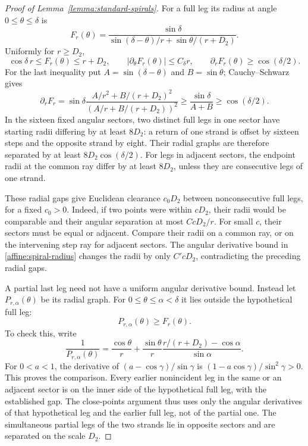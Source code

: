 \begin{proof}[Proof of Lemma~\ref{lemma:standard-spirals}]
For a full leg its radius at angle $0\le\theta\le\delta$ is
\begin{equation}\label{affine:spiral-radius}
 F_r(\theta)=
 \frac{\sin\delta}
 {\sin(\delta-\theta)/r+\sin\theta/(r+D_2)}.
\end{equation}
Uniformly for $r\ge D_2$,
\[
 \cos\delta\,r\le F_r(\theta)\le r+D_2,\qquad
 |\partial_\theta F_r(\theta)|\le C_\delta r,\qquad
 \partial_rF_r(\theta)\ge\cos(\delta/2).
\]
For the last inequality put $A=\sin(\delta-\theta)$ and
$B=\sin\theta$; Cauchy--Schwarz gives
\[
 \partial_rF_r
 =\sin\delta\frac{A/r^2+B/(r+D_2)^2}
                    {(A/r+B/(r+D_2))^2}
 \ge\frac{\sin\delta}{A+B}\ge\cos(\delta/2).
\]
In the sixteen fixed angular sectors, two distinct full legs in one
sector have starting radii differing by at least $8D_2$: a return of
one strand is offset by sixteen steps and the opposite strand by eight.
Their radial graphs are therefore separated by at least
$8D_2\cos(\delta/2)$.  For legs in adjacent sectors, the endpoint radii
at the common ray differ by at least $8D_2$, unless they are consecutive
legs of one strand.

These radial gaps give Euclidean clearance $c_0D_2$ between
nonconsecutive full legs, for a fixed $c_0>0$.  Indeed, if two points
were within $cD_2$, their radii would be comparable and their angular
separation at most $C cD_2/r$.  For small $c$, their sectors must be equal
or adjacent.  Compare their radii on a common ray, or on the intervening
step ray for adjacent sectors.  The angular derivative bound in
\eqref{affine:spiral-radius} changes the radii by only $C'cD_2$,
contradicting the preceding radial gaps.

A partial last leg need not have a uniform angular derivative bound.
Instead let $P_{r,\alpha}(\theta)$ be its radial graph.  For
$0\le\theta\le\alpha<\delta$ it lies outside the hypothetical full leg:
\[
 P_{r,\alpha}(\theta)\ge F_r(\theta).
\]
To check this, write
\[
 \frac1{P_{r,\alpha}(\theta)}
 =\frac{\cos\theta}{r}
 +\frac{\sin\theta}{r}
       \frac{r/(r+D_2)-\cos\alpha}{\sin\alpha}.
\]
For $0<a<1$, the derivative of
$(a-\cos\gamma)/\sin\gamma$ is
$(1-a\cos\gamma)/\sin^2\gamma>0$.
This proves the comparison.  Every earlier nonincident leg in the same
or an adjacent sector is on the inner side of the hypothetical full
leg, with the established gap.  The close-points argument thus uses only
the angular derivatives of that hypothetical leg and the earlier full
leg, not of the partial one.  The simultaneous partial legs of the two
strands lie in opposite sectors and are separated on the scale $D_2$.


\end{proof}
